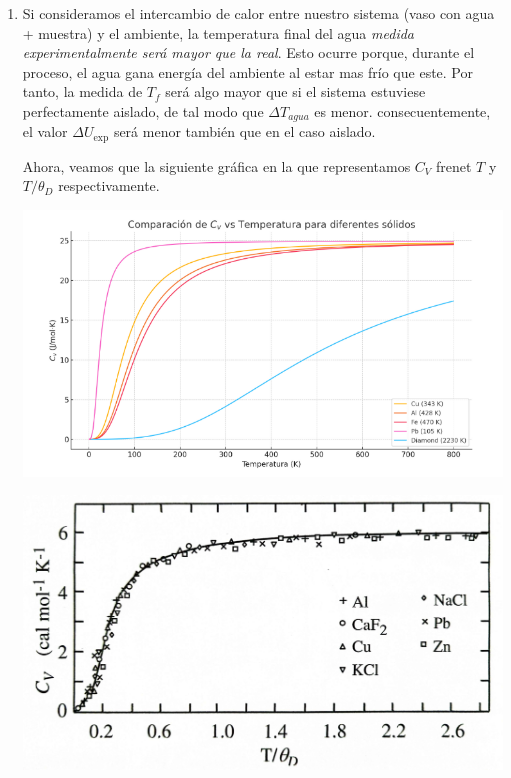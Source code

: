 \begin{enumerate}[label=\alph*)]
\item Si consideramos el intercambio de calor entre nuestro sistema (vaso con agua + muestra) y el ambiente, la temperatura final del agua \textit{medida experimentalmente será mayor que la real}. Esto ocurre porque, durante el proceso, el agua gana energía del ambiente al estar mas frío que este. Por tanto, la medida de $T_f$ será algo mayor que si el sistema estuviese perfectamente aislado, de tal modo que $\Delta T_{agua}$ es menor. consecuentemente, el valor $\Delta U_{\exp}$ será menor también que en el caso aislado. 

Ahora, veamos que la siguiente gráfica en la que representamos $C_V$ frenet $T$ y $T/\theta_D$ respectivamente. 

\begin{minipage}{0.47\linewidth}
    \includegraphics[width=1\linewidth]{Cuerpo/Ch_02/Examen_24_5-2.png}
\end{minipage} \hfill
\begin{minipage}{0.47\linewidth}    
    \includegraphics[width=1\linewidth]{Cuerpo/Ch_02/Examen_24_5-3.png}
\end{minipage}


\end{enumerate}
